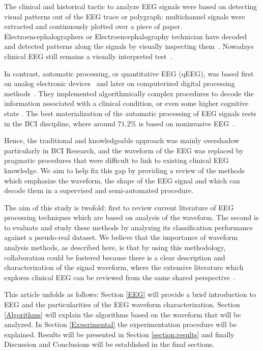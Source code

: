 \documentclass[brainsci,article,submit,moreauthors,pdftex,10pt,a4paper]{mdpi}
\begin{document}
The clinical and historical tactic to analyze EEG signals were based on detecting visual patterns out of the EEG trace or polygraph\citep{Hartman2005}: multichannel signals were extracted and continuously plotted over a piece of paper. Electroencephalographers or Electroencephalography technician have decoded and detected patterns along the signals by visually inspecting them~\citep{Schomer2010}.   Nowadays clinical EEG still remains a visually interpreted test~\citep{Hartman2005}.

In contrast, automatic processing, or quantitative EEG (qEEG), was based first on analog electronic devices~\citep{Jestico1977} and later on computerized digital processing methods~\citep{Jansen1991}.  They implemented algorithmically complex procedures to decode the information associated with a clinical condition, or even some higher cognitive state \citep{Yuste2017}.  The best materialization of the automatic processing of EEG signals rests in the BCI discipline, where around $71.2\%$ is based on noninvasive EEG~\citep{Guger2017}.  


Hence, the traditional and knowledgeable approach was mainly overshadow particularly in BCI Research, and the waveform of the EEG was replaced by pragmatic procedures that were difficult to link to existing clinical EEG knowledge.  We aim to help fix this gap by providing a review of the methods which emphasize the waveform, the shape of the EEG signal and which can decode them in a supervised and semi-automated procedure.

The aim of this study is twofold: first to review current literature of EEG processing techniques which are based on analysis of the waveform.  The second is to evaluate and study these methods by analyzing its classification performance against a pseudo-real dataset. We believe that the importance of waveform analysis methods, as described here, is that by using this methodology, collaboration could be fostered because there is a clear description and characterization of the signal waveform, where the extensive literature which explores clinical EEG can be reviewed from the same shared perspective~\citep{Nijboer2009,Wei2017}. 

This article unfolds as follows: Section \ref{EEG} will provide a brief introduction to EEG and the particularities of the EEG waveform characterization.  Section \ref{Algorithms} will explain the algorithms based on the waveform that will be analyzed.  In Section \ref{Experimental} the experimentation procedure will be explained.  Results will be presented in Section \ref{section:results} and finally Discussion and Conclusions will be established in the final sections.
\end{document}
